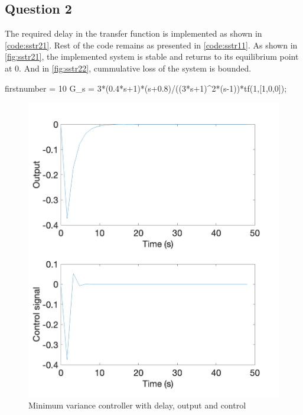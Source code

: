 \FloatBarrier
\subsection{Question 2}
The required delay in the transfer function is implemented as shown in \autoref{code:sstr21}. Rest of the code remains as presented in \autoref{code:sstr11}. As shown in \autoref{fig:sstr21}, the implemented system is stable and returns to its equilibrium point at $0$. And in \autoref{fig:sstr22}, cummulative loss of the system is bounded.

\begin{code}
	\begin{matlabcode}{firstnumber = 10}
G_s = 3*(0.4*s+1)*(s+0.8)/((3*s+1)^2*(s-1))*tf(1,[1,0,0]);
	\end{matlabcode}
	\label{code:sstr21}
\end{code}

\begin{figure}
	\centering
	\includegraphics[width=\textwidth]{images/sstr21.png}
	\caption{Minimum variance controller with delay, output and control}
	\label{fig:sstr21}
\end{figure}

